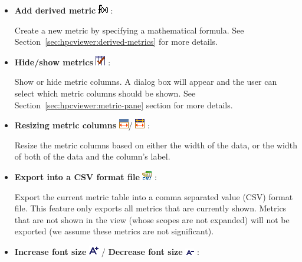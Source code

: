 \begin{itemize}
\item \textbf{Add derived metric} \includegraphics[scale=.8]{fig/hpcviewer-button-derivedmetric.png} :

Create a new metric by specifying a mathematical formula.
See Section~\ref{sec:hpcviewer:derived-metrics} for more details.

\item \textbf{Hide/show metrics} \includegraphics[scale=.8]{fig/hpcviewer-button-checkcolumns.png} :

Show or hide metric columns.
A dialog box will appear and the user can select which metric columns should be shown.
See Section~\ref{sec:hpcviewer:metric-pane} section for more details.

\item \textbf{Resizing metric columns} \includegraphics[scale=.8]{fig/hpcviewer-button-fitData.png}/
				       \includegraphics[scale=.8]{fig/hpcviewer-button-fitBoth.png} :

Resize the metric columns based on either the width of the data, or the width of both of the data and the column's label.

\item \textbf{Export into a CSV format file} \includegraphics[scale=.8]{fig/hpcviewer-button-csv.png} :

Export the current metric table into a comma separated value (CSV) format file.
This feature only exports all metrics that are currently shown.
Metrics that are not shown in the view (whose scopes are not expanded) will not be exported (we assume these metrics are not significant).

\item \textbf{Increase font size} \includegraphics[scale=.8]{fig/hpcviewer-button-fontplus.png} /
      \textbf{Decrease font size} \includegraphics[scale=.8]{fig/hpcviewer-button-fontminus.png} :


\end{itemize}
